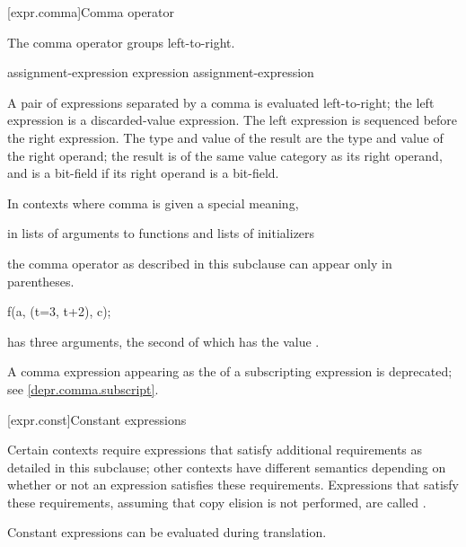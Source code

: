 [expr.comma]{Comma operator}%
%
%
%
%
%

\pnum
The comma operator groups left-to-right.

\begin{bnf}
\br
    assignment-expression\br
    expression \terminal{,} assignment-expression
\end{bnf}

A pair of expressions separated by a comma is evaluated left-to-right;
the left expression is
a discarded-value expression.
The left expression is sequenced before
the right expression.
%
The type and value of the
result are the type and value of the right operand; the result is of the same
value category as its right operand, and is a bit-field if its
right operand is a bit-field.

\pnum
In contexts where comma is given a special meaning,
\begin{example}
in
lists of arguments to functions and lists of
initializers
\end{example}
the comma operator as
described in this subclause can appear only in parentheses.
\begin{example}
\begin{codeblock}
f(a, (t=3, t+2), c);
\end{codeblock}
has three arguments, the second of which has the value
.
\end{example}

\pnum
\begin{note}
A comma expression
appearing as the 
of a subscripting expression is deprecated;
see \ref{depr.comma.subscript}.
\end{note}

[expr.const]{Constant expressions}%

\pnum
Certain contexts require expressions that satisfy additional
requirements as detailed in this subclause; other contexts have different
semantics depending on whether or not an expression satisfies these requirements.
Expressions that satisfy these requirements,
assuming that copy elision is not performed,
are called
%
.
\begin{note}
Constant expressions can be evaluated
during translation.
\end{note}

